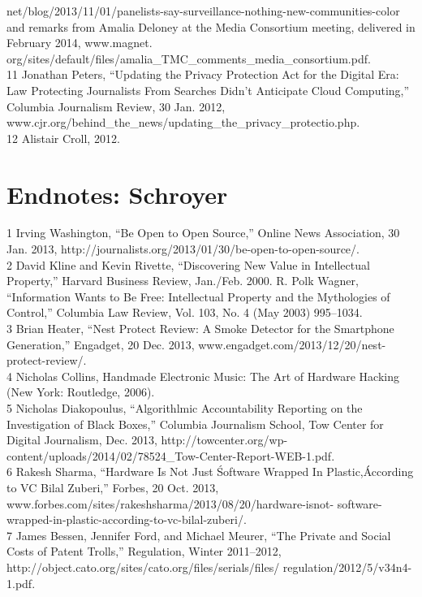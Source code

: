 \begin{itemize}
\begin{itemized}
\begin{itemize}
net/blog/2013/11/01/panelists-say-surveillance-nothing-new-communities-color and remarks
from Amalia Deloney at the Media Consortium meeting, delivered in February 2014, www.magnet.
org/sites/default/files/amalia_TMC_comments_media_consortium.pdf.\\
11 Jonathan Peters, ``Updating the Privacy Protection Act for the Digital Era: Law Protecting
Journalists From Searches Didn't Anticipate Cloud Computing,'' Columbia Journalism Review, 30
Jan. 2012, www.cjr.org/behind_the_news/updating_the_privacy_protectio.php.\\
12 Alistair Croll, 2012.\\

\section{Endnotes: Schroyer}
1 Irving Washington, ``Be Open to Open Source,'' Online News Association, 30 Jan. 2013,
http://journalists.org/2013/01/30/be-open-to-open-source/.\\
2 David Kline and Kevin Rivette, ``Discovering New Value in Intellectual Property,''
Harvard Business Review, Jan./Feb. 2000. R. Polk Wagner, ``Information Wants to Be Free:
Intellectual Property and the Mythologies of Control,'' Columbia Law Review, Vol. 103,
No. 4 (May 2003) 995–1034.\\
3 Brian Heater, ``Nest Protect Review: A Smoke Detector for the Smartphone Generation,''
Engadget, 20 Dec. 2013, www.engadget.com/2013/12/20/nest-protect-review/.\\
4 Nicholas Collins, Handmade Electronic Music: The Art of Hardware Hacking (New York:
Routledge, 2006).\\
5 Nicholas Diakopoulus, ``Algorithlmic Accountability Reporting on the Investigation of Black
Boxes,'' Columbia Journalism School, Tow Center for Digital Journalism, Dec. 2013,
http://towcenter.org/wp-content/uploads/2014/02/78524_Tow-Center-Report-WEB-1.pdf.\\
6 Rakesh Sharma, ``Hardware Is Not Just \'Software Wrapped In Plastic,\' According to VC Bilal
Zuberi,'' Forbes, 20 Oct. 2013, www.forbes.com/sites/rakeshsharma/2013/08/20/hardware-isnot-
software-wrapped-in-plastic-according-to-vc-bilal-zuberi/.\\
7 James Bessen, Jennifer Ford, and Michael Meurer, ``The Private and Social Costs of Patent
Trolls,'' Regulation, Winter 2011–2012, http://object.cato.org/sites/cato.org/files/serials/files/
regulation/2012/5/v34n4-1.pdf.\\

\end{itemize}
\end{itemized}
\end{itemize}

